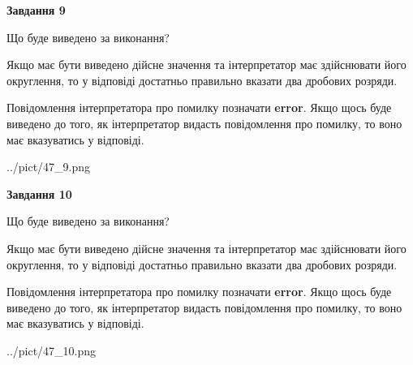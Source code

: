 \documentclass[12pt, ukrainian]{article}
\begin{document}
{\begin {Large}
{\begin {center}\textbf{Завдання 9}\end {center}}\par
Що буде виведено за виконання? \par

Якщо має бути виведено дійсне значення та інтерпретатор має здійснювати його округлення, 
то у відповіді достатньо правильно вказати два дробових розряди.

Повідомлення інтерпретатора про помилку позначати \textbf{error}.
Якщо щось буде виведено до того, як інтерпретатор видасть повідомлення про помилку, 
то воно має вказуватись у відповіді. \par

\begin{center}
	{../pict/47_9.png}
\end{center}
\newpage

{\begin {center}\textbf{Завдання 10}\end {center}}\par
Що буде виведено за виконання? \par

Якщо має бути виведено дійсне значення та інтерпретатор має здійснювати його округлення, 
то у відповіді достатньо правильно вказати два дробових розряди.

Повідомлення інтерпретатора про помилку позначати \textbf{error}.
Якщо щось буде виведено до того, як інтерпретатор видасть повідомлення про помилку, 
то воно має вказуватись у відповіді. \par

\begin{center}
	{../pict/47_10.png}
\end{center}
\newpage

\end {Large}}
\end{document}
